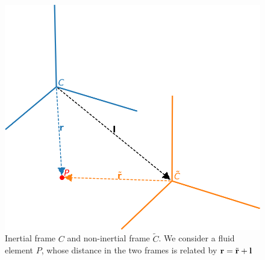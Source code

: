 \begin{figure}[t]
\centering
\includegraphics[width=0.5\linewidth]{tframes}
\caption{\label{fig:sec:rot:frames} Inertial frame $C$ and
non-inertial frame $\tilde{C}$.  We consider a fluid element
$P$, whose distance in the two frames is related by 
${\bf r} = \tilde{\bf{r}} + {\bf l}$}
\end{figure}

